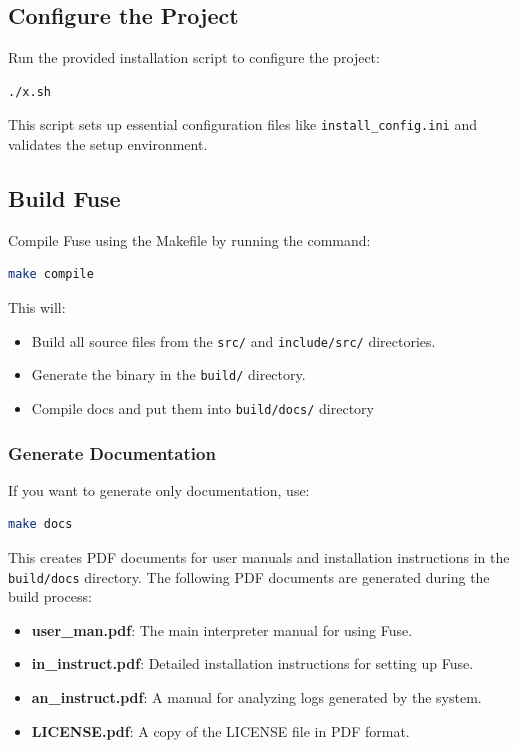 \documentclass[a4paper,12pt]{article}
\begin{document}
\subsection{Configure the Project}
Run the provided installation script to configure the project:
\begin{lstlisting}[language=bash]
./x.sh
\end{lstlisting}
This script sets up essential configuration files like \texttt{install\_config.ini} and validates the setup environment.

\subsection{Build Fuse}
Compile Fuse using the Makefile by running the command:
\begin{lstlisting}[language=bash]
make compile
\end{lstlisting}
This will:
\begin{itemize}
	\item Build all source files from the \texttt{src/} and \texttt{include/src/} directories.
	\item Generate the binary in the \texttt{build/} directory.
	\item Compile docs and put them into \texttt{build/docs/} directory
\end{itemize}

\subsubsection{Generate Documentation}
If you want to generate only documentation, use:
\begin{lstlisting}[language=bash]
make docs
\end{lstlisting}
This creates PDF documents for user manuals and installation instructions in the \texttt{build/docs} directory.
The following PDF documents are generated during the build process:
\begin{itemize}
	\item \textbf{user\_man.pdf}: The main interpreter manual for using Fuse.
	\item \textbf{in\_instruct.pdf}: Detailed installation instructions for setting up Fuse.
	\item \textbf{an\_instruct.pdf}: A manual for analyzing logs generated by the system.
	\item \textbf{LICENSE.pdf}: A copy of the LICENSE file in PDF format.
\end{itemize}
\end{document}
